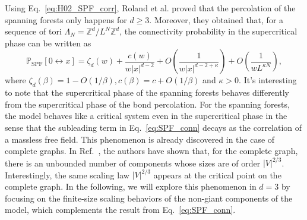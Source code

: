 Using Eq.~\eqref{eq:H02_SPF_corr}, Roland et al. proved that the percolation of the spanning forests only happens for $d\geq 3$.
Moreover, they obtained that, for a sequence of tori $\Lambda_N = \mathbb{Z}^d/L^N\mathbb{Z}^d$, the connectivity probability
in the supercritical phase can be written as
\begin{equation}\label{eq:SPF_conn}
	\mathbb{P}_{\text{SPF}}[0\leftrightarrow x] = \zeta_{d}(w)+\frac{c(w)}{w|x|^{d-2}}+O\left(\frac{1}{w|x|^{d-2+\kappa}}\right)+O\left(\frac{1}{w L^{\kappa N}}\right),
\end{equation}
where $\zeta_{d}(\beta)=1-O(1 / \beta), c(\beta)=c+O(1 / \beta)$ and $\kappa > 0$. It's interesting to note that the supercritical
phase of the spanning forests behaves differently from the supercritical phase of the bond percolation. For the spanning forests,
the model behaves like a critical system even in the supercritical phase in the sense that the subleading term in Eq.~\eqref{eq:SPF_conn}
decays as the correlation of a massless free field. This phenomenon is already discovered in the case of complete graphs. 
In Ref.~, the authors have shown that, for the complete graph, there is an unbounded number of components whose sizes are of order $|V|^{2/3}$.
Interestingly, the same scaling law $|V|^{2/3}$ appears at the critical point on the complete graph. In the following, 
we will explore this phenomenon in $d=3$ by focusing on the finite-size scaling behaviors of the non-giant components of the model, which
complements the result from Eq.~\eqref{eq:SPF_conn}.
